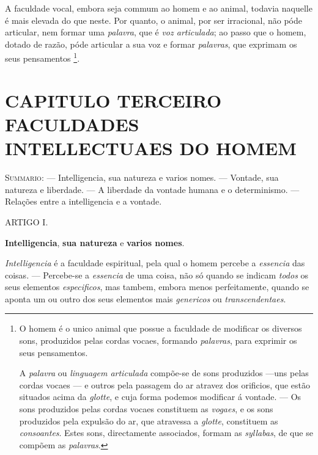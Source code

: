A faculdade vocal, embora seja commum ao homem e ao animal, todavia     naquelle é mais elevada do que neste. Por quanto, o animal, por ser irracional, não póde articular, nem formar uma \emph{palavra}, que é \emph{voz articulada}; ao passo que o homem, dotado de razão, póde articular a sua voz e formar \emph{palavras}, que exprimam os seus pensamentos \footnote{O homem é o unico animal que possue a faculdade de modificar os diversos sons, produzidos pelas cordas vocaes, formando \emph{palavras}, para exprimir os seus pensamentos.\par A \emph{palavra} ou \emph{linguagem articulada} compõe-se de sons produzidos ---uns pelas cordas vocaes --- e outros pela passagem do ar atravez dos orificios, que estão situados acima da \emph{glotte}, e cuja forma podemos modificar á vontade. --- Os sons produzidos pelas cordas vocaes constituem as \emph{vogaes}, e os sons produzidos pela expulsão do ar, que atravessa a \emph{glotte}, constituem as \emph{consoantes}. Estes sons, directamente associados, formam as \emph{syllabas}, de que se compõem as \emph{palavras}.}.


\chapter*{CAPITULO TERCEIRO\\[0.3em]\large FACULDADES INTELLECTUAES DO HOMEM}

\textsc{Summario}: --- Intelligencia, sua natureza e varios nomes. --- Vontade, sua natureza e liberdade. --- A liberdade da vontade humana e o determinismo. --- Relações entre a intelligencia e a vontade.

ARTIGO I.

\textbf{Intelligencia}, \textbf{sua natureza} e \textbf{varios nomes}.


\emph{Intelligencia} é a faculdade espiritual, pela qual o homem percebe a \emph{essencia} das coisas. --- Percebe-se a \emph{essencia} de uma coisa, não só quando se indicam \emph{todos}   os seus elementos \emph{especificos}, mas tambem, embora menos perfeitamente, quando se aponta um ou outro dos seus elementos mais \emph{genericos} ou \emph{transcendentaes}.

